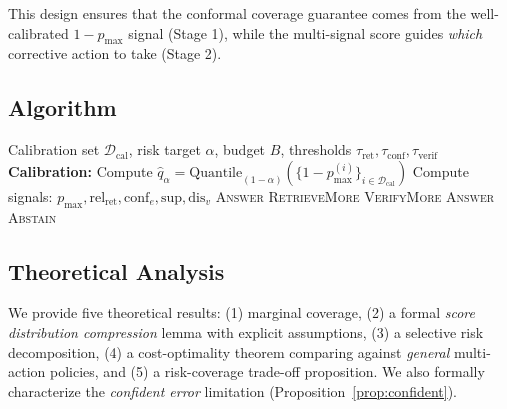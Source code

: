 \documentclass[letterpaper]{article}
\begin{document}
This design ensures that the conformal coverage guarantee comes from the well-calibrated $1-p_{\max}$ signal (Stage 1), while the multi-signal score guides \emph{which} corrective action to take (Stage 2).

\subsection{Algorithm}

\begin{algorithm}[t]
\caption{RC-TTD: Risk-Calibrated Test-Time Decision}
\label{alg:rcttd}
\begin{algorithmic}[1]
\REQUIRE Calibration set $\mathcal{D}_{\text{cal}}$, risk target $\alpha$, budget $B$, thresholds $\tau_{\text{ret}}, \tau_{\text{conf}}, \tau_{\text{verif}}$
\STATE \textbf{Calibration:} Compute $\hat{q}_\alpha = \text{Quantile}_{(1-\alpha)}(\{1-p_{\max}^{(i)}\}_{i \in \mathcal{D}_{\text{cal}}})$
    \STATE Compute signals: $p_{\max}, \text{rel}_{\text{ret}}, \text{conf}_e, \text{sup}, \text{dis}_v$
    \STATE {}
        \RETURN \textsc{Answer}
    \ENDIF
    \STATE {}
        \RETURN \textsc{RetrieveMore}
    \ENDIF
        \RETURN \textsc{VerifyMore}
    \ENDIF
        \RETURN \textsc{Answer} 
    \ENDIF
    \RETURN \textsc{Abstain}
\ENDFOR
\end{algorithmic}
\end{algorithm}

\subsection{Theoretical Analysis}
\label{sec:theory}

We provide five theoretical results: (1) marginal coverage, (2) a formal \emph{score distribution compression} lemma with explicit assumptions, (3) a selective risk decomposition, (4) a cost-optimality theorem comparing against \emph{general} multi-action policies, and (5) a risk-coverage trade-off proposition. We also formally characterize the \emph{confident error} limitation (Proposition~\ref{prop:confident}).
\end{document}
